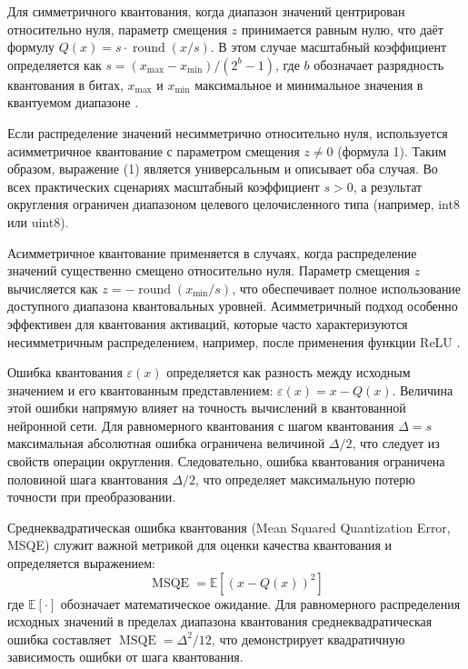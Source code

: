 \documentclass[bachelor, och, coursework]{SCWorks}
\begin{document}
	Для симметричного квантования, когда диапазон значений центрирован относительно нуля, параметр смещения \(z\) принимается равным нулю, что даёт формулу \(Q(x) = s \cdot \operatorname{round}(x / s)\). В этом случае масштабный коэффициент определяется как \(s = (x_{\max} - x_{\min}) / (2^{b} - 1)\), где \(b\) обозначает разрядность квантования в битах, \(x_{\max}\) и \(x_{\min}\) максимальное и минимальное значения в квантуемом диапазоне \cite{llmint8}.
	
	Если распределение значений несимметрично относительно нуля, используется асимметричное квантование с параметром смещения \(z \neq 0\) (формула 1). Таким образом, выражение (1) является универсальным и описывает оба случая. Во всех практических сценариях масштабный коэффициент \(s > 0\), а результат округления ограничен диапазоном целевого целочисленного типа (например, int8 или uint8).
	
	Асимметричное квантование применяется в случаях, когда распределение значений существенно смещено относительно нуля. Параметр смещения \(z\) вычисляется как \(z = -\operatorname{round}(x_{\min} / s)\), что обеспечивает полное использование доступного диапазона квантовальных уровней. Асимметричный подход особенно эффективен для квантования активаций, которые часто характеризуются несимметричным распределением, например, после применения функции ReLU \cite{awq}.
	
	Ошибка квантования \(\varepsilon(x)\) определяется как разность между исходным значением и его квантованным представлением: \(\varepsilon(x) = x - Q(x)\). Величина этой ошибки напрямую влияет на точность вычислений в квантованной нейронной сети. Для равномерного квантования с шагом квантования \(\Delta = s\) максимальная абсолютная ошибка ограничена величиной \(\Delta/2\), что следует из свойств операции округления. Следовательно, ошибка квантования ограничена половиной шага квантования \(\Delta/2\), что определяет максимальную потерю точности при преобразовании.
	
	Среднеквадратическая ошибка квантования (Mean Squared Quantization Error, MSQE) служит важной метрикой для оценки качества квантования и определяется выражением:
	\[
	\operatorname{MSQE} = \mathbb{E}\left[(x - Q(x))^{2}\right] \tag{2}
	\]
	где \(\mathbb{E}[\cdot]\) обозначает математическое ожидание. Для равномерного распределения исходных значений в пределах диапазона квантования среднеквадратическая ошибка составляет \(\operatorname{MSQE} = \Delta^{2}/12\), что демонстрирует квадратичную зависимость ошибки от шага квантования.
	
\end{document}
